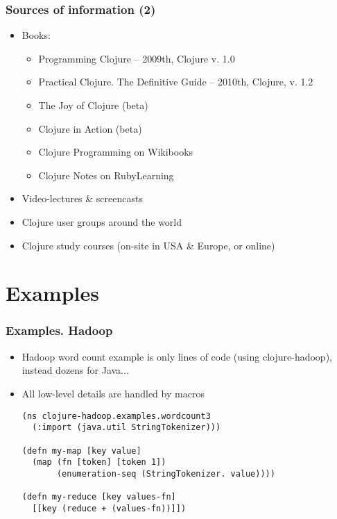 \begin{frame}[t]
  \frametitle{Sources of information (2)}
  \begin{itemize}
  \item Books:
    \begin{itemize}
    \item Programming Clojure -- 2009th, Clojure v. 1.0
    \item Practical Clojure. The Definitive Guide -- 2010th, Clojure, v. 1.2
    \item The Joy of Clojure (beta)
    \item Clojure in Action (beta)
    \item Clojure Programming on Wikibooks
    \item Clojure Notes on RubyLearning
    \end{itemize}
  \item Video-lectures \& screencasts 
  \item Clojure user groups around the world
  \item Clojure study courses (on-site in USA \& Europe, or online)
  \end{itemize}
\end{frame}

\section{Examples}

\begin{frame}[t, fragile]
  \frametitle{Examples. Hadoop}
  \begin{itemize}
  \item Hadoop word count example is only lines of code (using clojure-hadoop), instead
    dozens for Java...
  \item All low-level details are handled by macros
\begin{lstlisting}
(ns clojure-hadoop.examples.wordcount3
  (:import (java.util StringTokenizer)))

(defn my-map [key value]
  (map (fn [token] [token 1])
       (enumeration-seq (StringTokenizer. value))))

(defn my-reduce [key values-fn]
  [[key (reduce + (values-fn))]])
\end{lstlisting}
  \end{itemize}
\end{frame}

